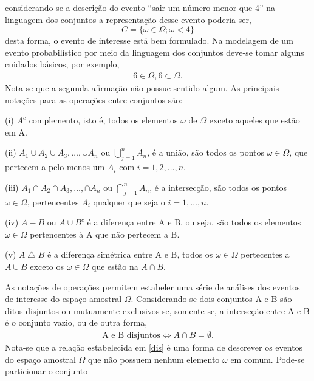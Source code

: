 considerando-se a descri\c c\~ao do evento ``sair um n\'{u}mero menor que 4'' na linguagem dos conjuntos a
representa\c{c}\~{a}o desse evento poderia ser, $$ C = \{\omega \in \Omega; \omega < 4 \}$$ desta forma, o
evento de interesse est\'{a} bem formulado. Na modelagem de um evento probabil\'istico por meio da linguagem
dos conjuntos deve-se tomar alguns cuidados b\'asicos, por exemplo, 
	\begin{align*} 
		6 \in \Omega, 6 \subset \Omega.
	\end{align*}
Nota-se que a segunda afirma\c c\~ao n\~ao possue sentido algum.  As principais
nota\c{c}\~{o}es para as opera\c{c}\~{o}es entre conjuntos s\~{a}o:
	\begin{description} 
		\item (i) $A^c$ complemento, isto \'e, todos os elementos $\omega$ de $\Omega$ exceto aqueles que est\~{a}o em A.
		\item (ii) $A_1 \cup A_2 \cup A_3, \dots ,\cup A_n$  ou $ \bigcup_{j = 1}^{n} A_n $, \'{e} a
		uni\~{a}o, s\~{a}o todos os pontos $\omega \in \Omega$, que pertecem a pelo menos um $A_i$ com $ i =
		1,2, \dots,n$. 
		\item (iii) $A_1 \cap A_2 \cap A_3, \dots ,\cap A_n$  ou $ \bigcap_{j = 1}^{n} A_n $,
		\'{e} a intersec\c{c}\~{a}o, s\~{a}o todos os pontos $\omega \in \Omega$, pertencentes $A_i$ qualquer
		que seja o $i = 1, \dots, n$.
		\item (iv) $A - B$ ou $A \cup B^c$ \'{e} a diferen\c{c}a entre A e B, ou
		seja, s\~{a}o todos os elementos $ \omega \in \Omega$ pertencentes \`{a} A que n\~{a}o pertecem a B.
		\item (v) $A \bigtriangleup B$ \'{e} a diferen\c{c}a sim\'{e}trica entre A e B, todos os $\omega \in \Omega$
	pertecentes a $A \cup B$ exceto os $\omega \in \Omega$ que est\~{a}o na $A \cap B$. 
	\end{description}
As nota\c c\~oes de opera\c c\~oes permitem estabeler uma s\'erie de an\'alises dos eventos de interesse do
espa\c co amostral $\Omega$.  Considerando-se dois conjuntos A e B s\~{a}o ditos disjuntos ou mutuamente
exclusivos se, somente se, a interse\c{c}\~{a}o entre A e B \'{e} o conjunto vazio, ou de outra forma,
	\begin{align}
		\label {dis} \textrm{A e B disjuntos} \Leftrightarrow A \cap B = \emptyset. 
	\end{align}
Nota-se que a rela\c c\~ao estabelecida em \ref{dis} \'e uma forma de descrever os eventos do espa\c co
amostral $\Omega$ que n\~ao possuem nenhum elemento $\omega$ em comum.  Pode-se particionar o conjunto
